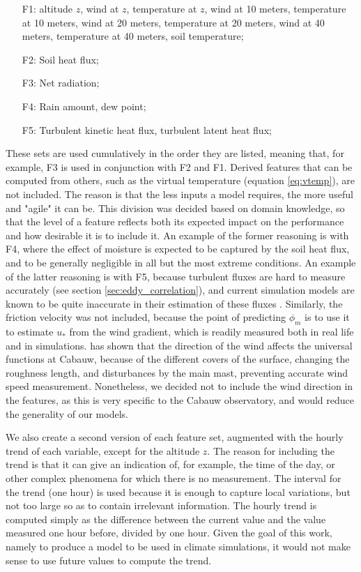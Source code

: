 \documentclass[12pt]{book}
\begin{document}
\begin{enumerate}
\item[F1:] altitude $z$, wind at $z$, temperature at $z$, wind at 10 meters, temperature at 10 meters, wind at 20 meters, temperature at 20 meters, wind at 40 meters, temperature at 40 meters, soil temperature;
\item[F2:] Soil heat flux;
\item[F3:] Net radiation;
\item[F4:] Rain amount, dew point;
\item[F5:] Turbulent kinetic heat flux, turbulent latent heat flux;
\end{enumerate}

These sets are used cumulatively in the order they are listed, meaning that, for example, F3 is used in conjunction with F2 and F1. Derived features that can be computed from others, such as the virtual temperature (equation \ref{eq:vtemp}), are not included. The reason is that the less inputs a model requires, the more useful and "agile" it can be. This division was decided based on domain knowledge, so that the level of a feature reflects both its expected impact on the performance and how desirable it is to include it. An example of the former reasoning is with F4, where the effect of moisture is expected to be captured by the soil heat flux, and to be generally negligible in all but the most extreme conditions. An example of the latter reasoning is with F5, because turbulent fluxes are hard to measure accurately (see section \ref{sec:eddy_correlation}), and current simulation models are known to be quite inaccurate in their estimation of these fluxes \citep{sheba}. Similarly, the friction velocity was not included, because the point of predicting $\phi_m$ is to use it to estimate $u_*$ from the wind gradient, which is readily measured both in real life and in simulations. \cite{cabauw_z0} has shown that the direction of the wind affects the universal functions at Cabauw, because of the different covers of the surface, changing the roughness length, and disturbances by the main mast, preventing accurate wind speed measurement. Nonetheless, we decided not to include the wind direction in the features, as this is very specific to the Cabauw observatory, and would reduce the generality of our models.

We also create a second version of each feature set, augmented with the hourly trend of each variable, except for the altitude $z$. The reason for including the trend is that it can give an indication of, for example, the time of the day, or other complex phenomena for which there is no measurement. The interval for the trend (one hour) is used because it is enough to capture local variations, but not too large so as to contain irrelevant information. The hourly trend is computed simply as the difference between the current value and the value measured one hour before, divided by one hour. Given the goal of this work, namely to produce a model to be used in climate simulations, it would not make sense to use future values to compute the trend.
\end{document}
